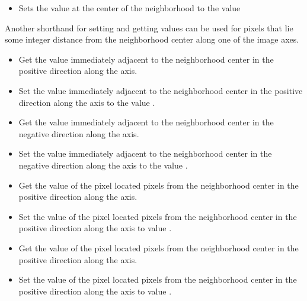 {\begin{itemize}
\item \textbf{} Sets the value at the
center of the neighborhood to the value 

\end{itemize}

Another shorthand for setting and getting values can be used for pixels that
lie some integer distance from the neighborhood center along one of the image axes.

\begin{itemize}

\item \textbf{} Get the value
immediately adjacent to the neighborhood center in the positive direction along
the  axis.

\item \textbf{} Set the value
immediately adjacent to the neighborhood center in the positive direction along
the  axis to the value .

\item \textbf{} Get the value
immediately adjacent to the neighborhood center in the negative direction along
the  axis.

\item \textbf{} Set the value
immediately adjacent to the neighborhood center in the negative direction along
the  axis to the value .

\item \textbf{} Get the
value of the pixel located  pixels from the neighborhood center in the positive
direction along the  axis.

\item \textbf{}
Set the value of the pixel located  pixels from the neighborhood center
in the positive direction along the  axis to value .

\item \textbf{} Get the
value of the pixel located  pixels from the neighborhood center in the positive
direction along the  axis.
 
\item \textbf{}  
Set the value of the pixel located  pixels from the neighborhood center
in the positive direction along the  axis to value .


\end{itemize}}
